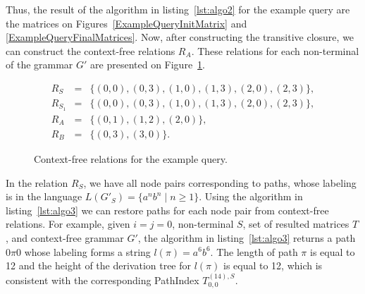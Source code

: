 Thus, the result of the algorithm in listing~\ref{lst:algo2} for the example query are the matrices on Figures~\ref{ExampleQueryInitMatrix} and \ref{ExampleQueryFinalMatrices}. Now, after constructing the transitive closure, we can construct the context-free relations $R_A$. These relations for each non-terminal of the grammar $G'$ are presented on Figure~\ref{ExampleQueryCFRelations}.

\begin{figure}[h]
	\begin{eqnarray*}
		R_S&=&\{(0,0),(0,3),(1,0),(1,3),(2,0),(2,3)\},\\
		R_{S_1}&=&\{(0,0),(0,3),(1,0),(1,3),(2,0),(2,3)\},\\
		R_{A}&=&\{(0,1),(1,2),(2,0)\}, \\
		R_{B}&=&\{(0,3), (3,0)\}.
	\end{eqnarray*}
	\caption{Context-free relations for the example query.}
	\label{ExampleQueryCFRelations}
\end{figure}

In the relation $R_S$, we have all node pairs corresponding to paths, whose labeling is in the language $L(G'_S) = \{a^n b^n \mid n \geq 1\}$. Using the algorithm in listing~\ref{lst:algo3} we can restore paths for each node pair from context-free relations. For example, given $i=j=0$, non-terminal $S$, set of resulted matrices $T$, and context-free grammar $G'$, the algorithm in listing~\ref{lst:algo3} returns a path $0\pi 0$ whose labeling forms a string $l(\pi) = a^6 b^6$. The length of path $\pi$ is equal to 12 and the height of the derivation tree for $l(\pi)$ is equal to 12, which is consistent with the corresponding PathIndex $T^{(14),S}_{0,0}$.